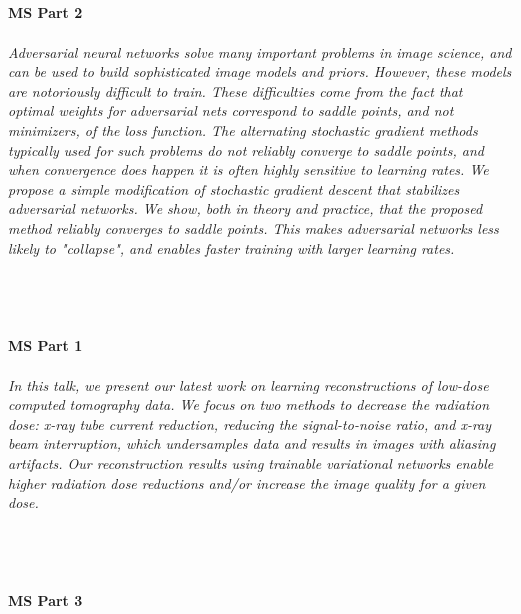 \begin{multicols}{2}
\\ 
    \\
    \\\\
    \noindent\textbf{MS Part 2}\\
\\  
    \textit{Adversarial neural networks solve many important problems in image science, and can be used to build sophisticated image models and priors.  However, these models are notoriously difficult to train. These difficulties come from the fact that optimal weights for adversarial nets correspond to saddle points, and not minimizers, of the loss function. The alternating stochastic gradient methods typically used for such problems do not reliably converge to saddle points, and when convergence does happen it is often highly sensitive to learning rates. We propose a simple modification of stochastic gradient descent that stabilizes adversarial networks. We show, both in theory and practice, that the proposed method reliably converges to saddle points. This makes adversarial networks less likely to "collapse", and enables faster training with larger learning rates.}\\
\\ 
    \\
    \\\\
    \noindent\textbf{MS Part 1}\\
\\  
    \textit{In this talk, we present our latest work on learning reconstructions of low-dose computed tomography data.
We focus on two methods to decrease the radiation dose: x-ray tube current reduction, reducing the signal-to-noise ratio, and x-ray beam interruption, which undersamples data and results in images with aliasing artifacts. 
Our reconstruction results using trainable variational networks enable higher radiation dose reductions and/or increase the image quality for a given dose.}\\
\\ 
    \\
    \\\\
    \noindent\textbf{MS Part 3}\\
\\  

\end{multicols}
